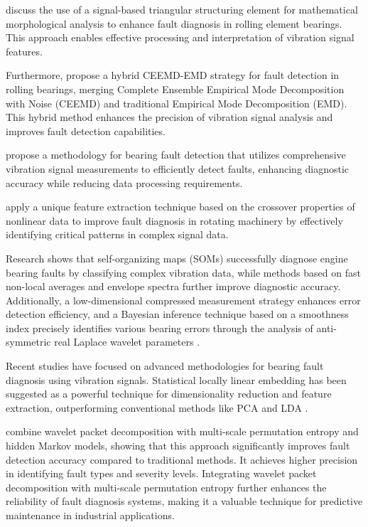 \documentclass[sn-basic,pdflatex]{sn-jnl}
\theoremstyle{remark}
\theoremstyle{definition}
\begin{document}
\citet{WOS:000334316700001} discuss the use of a signal-based triangular
structuring element for mathematical morphological analysis to enhance
fault diagnosis in rolling element bearings. This approach enables
effective processing and interpretation of vibration signal features.

Furthermore, \citet{WOS:000412752200052} propose a hybrid CEEMD-EMD
strategy for fault detection in rolling bearings, merging Complete
Ensemble Empirical Mode Decomposition with Noise (CEEMD) and traditional
Empirical Mode Decomposition (EMD). This hybrid method enhances the
precision of vibration signal analysis and improves fault detection
capabilities.

\citet{WOS:000335959500009} propose a methodology for bearing fault
detection that utilizes comprehensive vibration signal measurements to
efficiently detect faults, enhancing diagnostic accuracy while reducing
data processing requirements.

\citet{WOS:000338603900013} apply a unique feature extraction technique
based on the crossover properties of nonlinear data to improve fault
diagnosis in rotating machinery by effectively identifying critical
patterns in complex signal data.

Research shows that self-organizing maps (SOMs) successfully diagnose
engine bearing faults by classifying complex vibration data, while
methods based on fast non-local averages and envelope spectra further
improve diagnostic accuracy. Additionally, a low-dimensional compressed
measurement strategy enhances error detection efficiency, and a Bayesian
inference technique based on a smoothness index precisely identifies
various bearing errors through the analysis of anti-symmetric real
Laplace wavelet parameters
\citep{WOS:000380543400119, WOS:000348309400067, WOS:000354607100016, WOS:000350998800016}.

Recent studies have focused on advanced methodologies for bearing fault
diagnosis using vibration signals. Statistical locally linear embedding
has been suggested as a powerful technique for dimensionality reduction
and feature extraction, outperforming conventional methods like PCA and
LDA \citep{WOS:000361788200068}.

\citet{WOS:000362513400031} combine wavelet packet decomposition with
multi-scale permutation entropy and hidden Markov models, showing that
this approach significantly improves fault detection accuracy compared
to traditional methods. It achieves higher precision in identifying
fault types and severity levels. Integrating wavelet packet
decomposition with multi-scale permutation entropy further enhances the
reliability of fault diagnosis systems, making it a valuable technique
for predictive maintenance in industrial applications.
\end{document}
